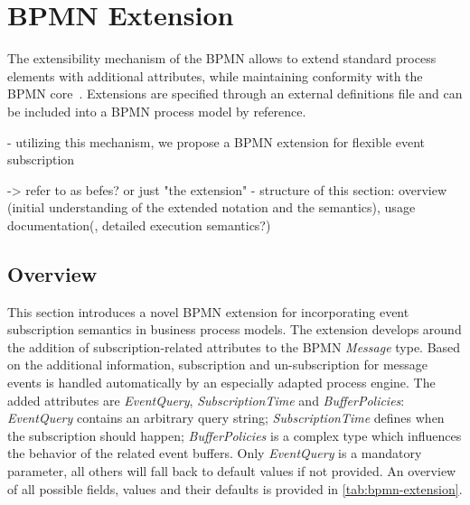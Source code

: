 \section{BPMN Extension}\label{ch:bpmnx}


The extensibility mechanism of the \ac{BPMN} allows to extend standard process elements with additional attributes, while maintaining conformity with the BPMN core~\cite[p.\,44]{bpmnspec}.
Extensions are specified through an external definitions file and can be included into a BPMN process model by reference.


- utilizing this mechanism, we propose a BPMN extension for flexible event subscription

-> refer to as befes? or just "the extension"
- structure of this section: overview (initial understanding of the extended notation and the semantics), usage documentation(, detailed execution semantics?)

\subsection{Overview}
This section introduces a novel BPMN extension for incorporating event subscription semantics in business process models.
The extension develops around the addition of subscription-related attributes to the BPMN \textit{Message} type. Based on the additional information, subscription and un-subscription for message events is handled automatically by an especially adapted process engine.
The added attributes are \textit{EventQuery}, \textit{SubscriptionTime} and \textit{BufferPolicies}:
\textit{EventQuery} contains an arbitrary query string; \textit{SubscriptionTime} defines when the subscription should happen; \textit{BufferPolicies} is a complex type which influences the behavior of the related event buffers.
Only \textit{EventQuery} is a mandatory parameter, all others will fall back to default values if not provided.
An overview of all possible fields, values and their defaults is provided in \autoref{tab:bpmn-extension}.


